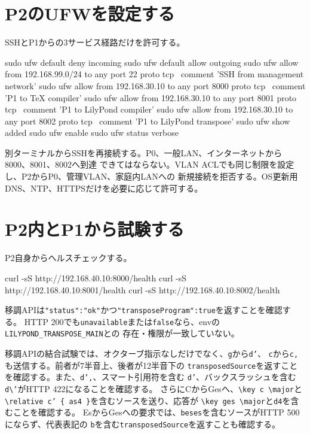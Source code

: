 \documentclass[uplatex,a4paper,11pt]{jsarticle}
\begin{document}
\section{P2のUFWを設定する}

SSHとP1からの3サービス経路だけを許可する。

\begin{command}
sudo ufw default deny incoming
sudo ufw default allow outgoing
sudo ufw allow from 192.168.99.0/24 to any port 22 proto tcp \
  comment 'SSH from management network'
sudo ufw allow from 192.168.30.10 to any port 8000 proto tcp \
  comment 'P1 to TeX compiler'
sudo ufw allow from 192.168.30.10 to any port 8001 proto tcp \
  comment 'P1 to LilyPond compiler'
sudo ufw allow from 192.168.30.10 to any port 8002 proto tcp \
  comment 'P1 to LilyPond transpose'
sudo ufw show added
sudo ufw enable
sudo ufw status verbose
\end{command}

別ターミナルからSSHを再接続する。P0、一般LAN、インターネットから8000、8001、8002へ到達
できてはならない。VLAN ACLでも同じ制限を設定し、P2からP0、管理VLAN、家庭内LANへの
新規接続を拒否する。OS更新用DNS、NTP、HTTPSだけを必要に応じて許可する。

\section{P2内とP1から試験する}

P2自身からヘルスチェックする。

\begin{command}
curl -sS http://192.168.40.10:8000/health
curl -sS http://192.168.40.10:8001/health
curl -sS http://192.168.40.10:8002/health
\end{command}

移調APIは\texttt{"status":"ok"}かつ\texttt{"transposeProgram":true}を返すことを確認する。
HTTP 200でも\texttt{unavailable}または\texttt{false}なら、envの
\texttt{LILYPOND\_TRANSPOSE\_MAIN}との
存在・権限が一致していない。

移調APIの結合試験では、オクターブ指示なしだけでなく、\texttt{g}から\texttt{d'}、
\texttt{c}から\texttt{c,}も送信する。前者が7半音上、後者が12半音下の
\texttt{transposedSource}を返すことを確認する。また、\texttt{d',}、スマート引用符を含む
\texttt{d’}、バックスラッシュを含む\texttt{d\textbackslash'}がHTTP 422になることを確認する。
さらにCからGesへ、\texttt{\textbackslash key c \textbackslash major}と
\texttt{\textbackslash relative c' \{ as4 \}}を含むソースを送り、応答が
\texttt{\textbackslash key ges \textbackslash major}と\texttt{d4}を含むことを確認する。
EsからGesへの要求では、\texttt{beses}を含むソースがHTTP 500にならず、代表表記の
\texttt{b}を含む\texttt{transposedSource}を返すことも確認する。
\end{document}
